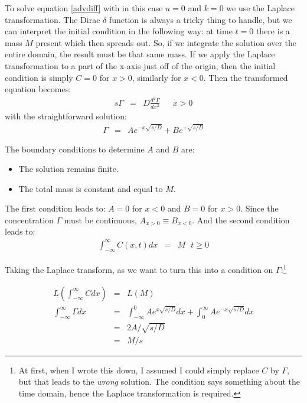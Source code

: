 \documentclass[onecolumn]{article}
\begin{document}
To solve equation \ref{advdiff} with in this case $u = 0$ and $k = 0$ we use the Laplace transformation. The Dirac $\delta$
function is always a tricky thing to handle, but we can interpret the initial condition in the following way: at
time $t = 0$ there is a mass $M$ present which then spreads out. So, if we integrate the solution over the entire
domain, the result must be that same mass. If we apply the Laplace transformation to a part of the x-axis just off of
the origin, then the initial condition is simply $C = 0$ for $x > 0$, similarly for $x < 0$. Then the transformed equation becomes:
\begin{eqnarray}
\nonumber    s \Gamma &=& D \frac{d^2 \Gamma}{d x^2} ~~~~~~~x > 0
\end{eqnarray}
\noindent with the straightforward solution:
\begin{eqnarray}
\nonumber    \Gamma &=& A e^{-x \sqrt{s/D}} + B e^{+ \sqrt{s/D}}
\end{eqnarray}

The boundary conditions to determine $A$ and $B$ are:
\begin{itemize}
\item
The solution remains finite.
\item
The total mass is constant and equal to $M$.
\end{itemize}

The first condition leads to: $A = 0$ for $x < 0$ and $B = 0$ for $x > 0$. Since the concentration $\Gamma$ must be
continuous, $A_{x>0} \equiv B_{x<0}$. And the second condition leads to:
\begin{eqnarray}
\nonumber   \int^{\infty}_{-\infty} C(x,t) dx &=& M  ~~~ t \geq 0
\end{eqnarray}

Taking the Laplace transform, as we want to turn this into a condition on $\Gamma$:\footnote{At first, when I wrote
this down, I assumed I could simply replace $C$ by $\Gamma$, but that leads to the \emph{wrong} solution. The condition
says something about the time domain, hence the Laplace transformation is required.}

\begin{eqnarray}
\nonumber   L( \int^{\infty}_{-\infty} C  dx ) &=& L(M) \\
\nonumber   \int^{\infty}_{-\infty} \Gamma dx &=& \int^{0}_{-\infty} A e^{x \sqrt{s/D}} dx + \int^{\infty}_{0} A e^{-x \sqrt{s/D}} dx \\
\nonumber                                     &=& 2A / \sqrt{s/D} \\
\nonumber                                     &=& M/s
\end{eqnarray}
\end{document}
